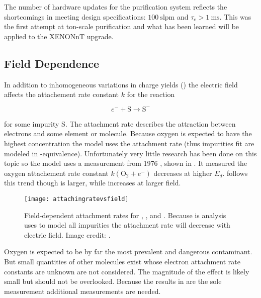 The number of hardware updates for the purification system reflects the shortcomings in meeting design specifications:
$100\ \mathrm{slpm}$ and $\tau_e > 1\ \mathrm{ms}$.  This was the first attempt at ton-scale purification and what has been learned will
be applied to the XENONnT upgrade.



\subsection{Field Dependence}
\label{subsec:electron_lifetime_model_field}
In addition to inhomogeneous variations in charge yields () the electric field affects
the attachement rate constant $k$ for the reaction

\vspace{-15pt}

\begin{equation}
e^- + \mathrm{S} \rightarrow \mathrm{S^-}
\end{equation}

\vspace{-10pt}

\noindent for some impurity S.  The attachment rate describes the attraction between electrons and some element or molecule.  Because
oxygen is expected to have the highest concentration the model uses the  attachment rate (thus impurities fit are modeled
in -equivalence).  Unfortunately very little research has been done on this topic so the model uses a measurement from
1976 , shown in .  It measured the oxygen attachement rate
constant $k(\mathrm{O_2} + e^-)$ decreases at higher $E_d$.   follows this trend though is larger, while
 increases at larger field.

\begin{figure}
\centering
\texttt{[image: attachingratevsfield]}
\caption{Field-dependent attachment rates for , , and .  Because is analysis uses  to model all
impurities the attachment rate will decrease with electric field.  Image credit: .}
\label{fig:electron_lifetime_model_field_attaching_rate}
\end{figure}

Oxygen is expected to be by far the most prevalent and dangerous contaminant.  But small
quantities of other molecules exist whose electron attachment rate constants are unknown are not considered.  The magnitude of the effect
is likely small but should not be overlooked.  Because the results in  are
the sole measurement additional measurements are needed.

